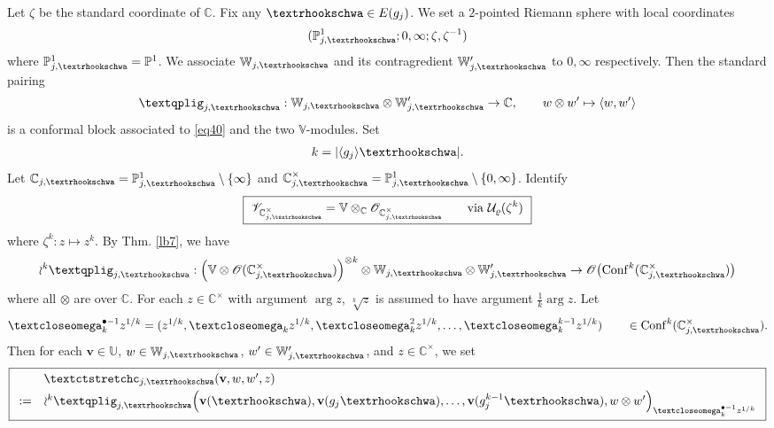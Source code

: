 \documentclass[12pt,a4paper,notitlepage]{article}
\theoremstyle{definition}
\theoremstyle{plain}
\newcommand{\mc}{\mathcal}
\newcommand{\Conf}{\mathrm{Conf}}
\newcommand{\bk}[1]{\langle {#1}\rangle}
\newcommand{\scr}{\mathscr}
\newcommand{\blt}{\bullet}
\newcommand{\Vbb}{\mathbb V}
\newcommand{\Ubb}{\mathbb U}
\newcommand{\Wbb}{\mathbb W}
\newcommand{\Cbb}{\mathbb C}
\newcommand{\Pbb}{\mathbb P}
\newcommand{\vbf}{\mathbf v}
\newcommand{\tipaomega}{\text{\textcloseomega}}
\newcommand{\tipae}{\text{\textrhookschwa}}
\newcommand{\tipxcc}{\text{\textctstretchc}}
\newcommand{\tipxphi}{\text{\textqplig}}
\numberwithin{equation}{subsection}
\begin{document}
Let $\zeta$ be the standard coordinate of $\Cbb$. Fix any $\tipae\in E(g_j)$. We set a $2$-pointed Riemann sphere with local coordinates
\begin{align}
(\Pbb^1_{j,\tipae};0,\infty;\zeta,\zeta^{-1})	\label{eq40}
\end{align}
where $\Pbb^1_{j,\tipae}=\Pbb^1$. We associate $\Wbb_{j,\tipae}$ and its contragredient  $\Wbb_{j,\tipae}'$ to $0,\infty$ respectively. Then the standard pairing \index{zz@$\tipxphi_{j,\tipae}$}
\begin{gather}
\tipxphi_{j,\tipae}:	\Wbb_{j,\tipae}\otimes \Wbb_{j,\tipae}'\rightarrow\Cbb, \qquad w\otimes w'\mapsto \bk{w,w'}\label{eq33}
\end{gather}
is a conformal block associated to \eqref{eq40} and the two $\Vbb$-modules. Set
\begin{align}
{k}=|\bk{g_j}\tipae|.	
\end{align}
Let $\Cbb_{j,\tipae}=\Pbb_{j,\tipae}^1\setminus\{\infty\}$ and $\Cbb_{j,\tipae}^\times=\Pbb_{j,\tipae}^1\setminus\{0,\infty\}$. Identify
\begin{align}
\boxed{~\scr V_{\Cbb^\times_{j,\tipae}}=\Vbb\otimes_\Cbb\scr O_{\Cbb^\times_{j,\tipae}}\qquad \text{via }\mc U_\varrho(\zeta^{{k}})~}\label{eq35}
\end{align}
where $\zeta^k:z\mapsto z^k$. By Thm. \ref{lb7}, we have
\begin{align*}
\wr^{{k}}\tipxphi_{j,\tipae}:\Big(\Vbb\otimes\scr O(\Cbb_{j,\tipae}^\times)\Big)^{\otimes {k}}\otimes \Wbb_{j,\tipae}\otimes \Wbb_{j,\tipae}'\rightarrow\scr O\big(\Conf^{{k}}(\Cbb_{j,\tipae}^\times)\big)
\end{align*}
where all $\otimes$ are over $\Cbb$. For each $z\in\Cbb^\times$ with argument $\arg z$,  $\sqrt[k]z$ is assumed to have argument $\frac 1k\arg z$. Let \index{zz@$\tipaomega_k^{\blt-1}z^{1/k}$}
\begin{align*}
\tipaomega_k^{\blt-1}z^{1/k}=(z^{1/k},\tipaomega_kz^{1/k},\tipaomega_k^2z^{1/k},\dots,\tipaomega_k^{k-1}z^{1/k})	\qquad\in\Conf^k(\Cbb^\times_{j,\tipae}).
\end{align*}
Then for each $\vbf\in\Ubb$, $w\in \Wbb_{j,\tipae}$, $w'\in \Wbb_{j,\tipae}'$, and $z\in\Cbb^\times$, we set \index{zz@$\tipxcc_{j,\tipae}$}
\begin{align}
\boxed{\begin{array}{rl}
&\tipxcc_{j,\tipae}(\vbf,w,w',z)\\[0.7ex]
:=&	\wr^{{k}}\tipxphi_{j,\tipae}\Big(\vbf(\tipae),\vbf(g_j\tipae),\dots,\vbf(g_j^{{k}-1}\tipae), w\otimes w'\Big)_{\tipaomega_{{k}}^{\blt-1}z^{1/{k}}}
\end{array}}	\label{eq29}
\end{align}
\end{document}
